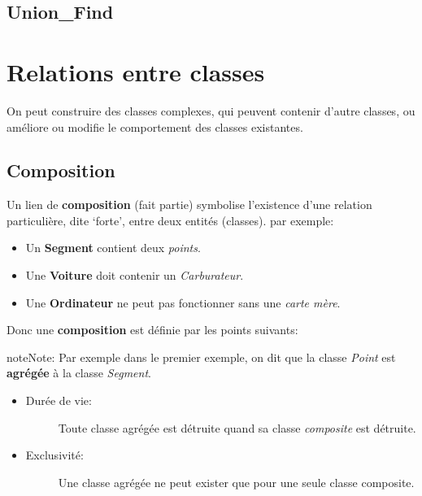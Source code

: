 \documentclass[letterpaper,10pt,english]{sphinxmanual}
\begin{document}
\subsection{Union\_Find}
\label{classes:union-find}

\section{Relations entre classes}
\label{classes2:relations-entre-classes}\label{classes2::doc}
On peut construire des classes complexes, qui peuvent contenir d'autre classes, ou améliore  ou modifie le comportement des classes existantes.


\subsection{Composition}
\label{classes2:composition}
Un lien de \textbf{composition} (fait partie) symbolise l'existence d'une relation particulière, dite `forte', entre deux entités (classes). par exemple:
\begin{itemize}
\item {} 
Un \textbf{Segment} contient deux \emph{points}.

\item {} 
Une \textbf{Voiture} doit contenir un \emph{Carburateur}.

\item {} 
Une \textbf{Ordinateur} ne peut pas fonctionner sans une \emph{carte mère}.

\end{itemize}

Donc une \textbf{composition} est définie par les points suivants:

\begin{notice}{note}{Note:}
Par exemple dans le premier exemple, on dit que la classe \emph{Point} est \textbf{agrégée} à la classe \emph{Segment}.
\end{notice}
\begin{itemize}
\item {} \begin{description}
\item[{Durée de vie:}] \leavevmode
Toute classe agrégée est détruite quand sa classe \emph{composite}  est détruite.

\end{description}

\item {} \begin{description}
\item[{Exclusivité:}] \leavevmode
Une classe agrégée ne peut exister que pour une seule classe composite.

\end{description}

\end{itemize}
\end{document}
